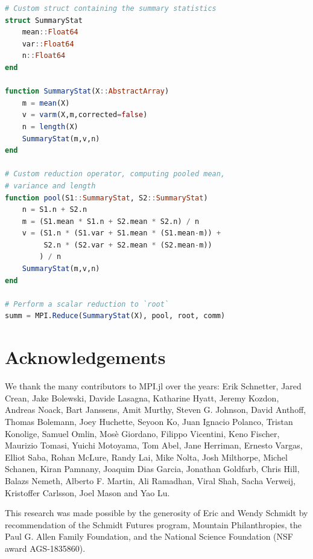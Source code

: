 \documentclass{juliacon}
\begin{document}
\begin{lstlisting}[language = Julia]
# Custom struct containing the summary statistics
struct SummaryStat
    mean::Float64
    var::Float64
    n::Float64
end

function SummaryStat(X::AbstractArray)
    m = mean(X)
    v = varm(X,m,corrected=false)
    n = length(X)
    SummaryStat(m,v,n)
end

# Custom reduction operator, computing pooled mean,
# variance and length
function pool(S1::SummaryStat, S2::SummaryStat)
    n = S1.n + S2.n
    m = (S1.mean * S1.n + S2.mean * S2.n) / n
    v = (S1.n * (S1.var + S1.mean * (S1.mean-m)) +
         S2.n * (S2.var + S2.mean * (S2.mean-m))
        ) / n
    SummaryStat(m,v,n)
end

# Perform a scalar reduction to `root`
summ = MPI.Reduce(SummaryStat(X), pool, root, comm)
\end{lstlisting}

\section{Acknowledgements}
\label{sec:acknowledgements}

We thank the many contributors to MPI.jl over the years: Erik Schnetter,
Jared Crean, Jake Bolewski, Davide Lasagna, Katharine Hyatt, Jeremy
Kozdon, Andreas Noack, Bart Janssens, Amit Murthy, Steven G. Johnson,
David Anthoff, Thomas Bolemann, Joey Huchette, Seyoon Ko, Juan Ignacio
Polanco, Tristan Konolige, Samuel Omlin, Mosè Giordano, Filippo
Vicentini, Keno Fischer, Maurizio Tomasi, Yuichi Motoyama, Tom Abel,
Jane Herriman, Ernesto Vargas, Elliot Saba, Rohan McLure, Randy Lai,
Mike Nolta, Josh Milthorpe, Michel Schanen, Kiran Pamnany, Joaquim Dias
Garcia, Jonathan Goldfarb, Chris Hill, Balazs Nemeth, Alberto F. Martin,
Ali Ramadhan, Viral Shah, Sacha Verweij, Kristoffer Carlsson, Joel Mason
and Yao Lu.

This research was made possible by the generosity of Eric and Wendy
Schmidt by recommendation of the Schmidt Futures program, Mountain
Philanthropies, the Paul G. Allen Family Foundation, and the National
Science Foundation (NSF award AGS-1835860).



\end{document}
